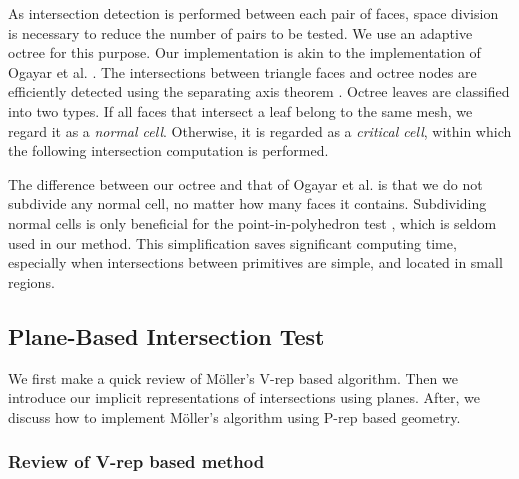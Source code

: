 As intersection detection is performed between each pair of faces, space division is necessary to reduce the number of pairs to be tested. We use an adaptive octree for this purpose. Our implementation is akin to the implementation of Ogayar et al. \cite{ogayar2015deferred}. The intersections between triangle faces and octree nodes are efficiently detected using the separating axis theorem \cite{gottschalk1996obbtree}. Octree leaves are classified into two types. If all faces that intersect a leaf belong to the same mesh, we regard it as a \emph{normal cell}. Otherwise, it is regarded as a \emph{critical cell}, within which the following intersection computation is performed.


The difference between our octree and that of Ogayar et al. is that we do not subdivide any normal cell, no matter how many faces it contains. Subdividing normal cells is only beneficial for the point-in-polyhedron test \cite{frisken2002simple}, which is seldom used in our method. This simplification saves significant computing time, especially when intersections between primitives are simple, and located in small regions.

\subsection{Plane-Based Intersection Test}

We first make a quick review of M\"{o}ller's V-rep based algorithm. Then we introduce our implicit representations of intersections using planes. After, we discuss how to implement  M\"{o}ller's algorithm using P-rep based geometry.

\subsubsection{Review of V-rep based method}



